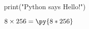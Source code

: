 \documentclass{article}
\newcommand{\pymultiply}[2]{\py{#1*#2}}
\begin{document}
\begin{pycode}
print("Python says Hello!")
\end{pycode}

$8 \times 256 = \pymultiply{8}{256}$
\end{document}
